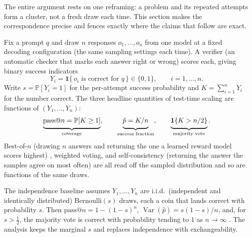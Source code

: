 \documentclass[11pt]{article}
\newcommand{\Prob}{\mathbb{P}}
\newcommand{\Var}{\operatorname{Var}}
\begin{document}
The entire argument rests on one reframing: a problem and its repeated attempts form a cluster, not a fresh draw each time. This section makes the correspondence precise and fences exactly where the claims that follow are exact.

Fix a prompt $q$ and draw $n$ responses $o_1,\dots,o_n$ from one model at a fixed decoding configuration (the same sampling settings each time). A verifier (an automatic checker that marks each answer right or wrong) scores each, giving binary success indicators
\begin{equation}
Y_i = \mathbf{1}\{\,o_i \text{ is correct for } q\,\} \in \{0,1\},
\qquad i = 1,\dots,n .
\label{eq:Y}
\end{equation}
Write $s = \Prob[Y_i = 1]$ for the per-attempt success probability and $K = \sum_{i=1}^n Y_i$ for the number correct. The three headline quantities of test-time scaling are functions of $(Y_1,\dots,Y_n)$:
\begin{equation}
\underbrace{\mathrm{pass}@n = \Prob[K \ge 1]\rule[-5pt]{0pt}{0pt}}_{\text{coverage}},
\qquad
\underbrace{\hat p = K/n\rule[-5pt]{0pt}{0pt}}_{\text{success fraction}},
\qquad
\underbrace{\mathbf{1}\{K > n/2\}\rule[-5pt]{0pt}{0pt}}_{\text{majority vote}} .
\label{eq:estimands}
\end{equation}
Best-of-$n$ (drawing $n$ answers and returning the one a learned reward model scores highest) \citep{cobbe2021gsm8k}, weighted voting, and self-consistency (returning the answer the samples agree on most often) are all read off the sampled distribution and so are functions of the same draws.

The independence baseline assumes $Y_1,\dots,Y_n$ are i.i.d.\ (independent and identically distributed) Bernoulli$(s)$ draws, each a coin that lands correct with probability $s$. Then $\mathrm{pass}@n = 1-(1-s)^n$, $\Var(\hat p) = s(1-s)/n$, and, for $s>\tfrac12$, the majority vote is correct with probability tending to $1$ as $n\to\infty$ \citep{chen2021codex}. The analysis keeps the marginal $s$ and replaces independence with exchangeability.
\end{document}
